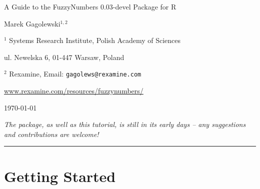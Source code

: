 \documentclass[11pt]{article}\usepackage{graphicx, color}
\newcommand{\hlnumber}[1]{\textcolor[rgb]{0,0,0}{#1}}%
\newcommand{\hlfunctioncall}[1]{\textcolor[rgb]{0.501960784313725,0,0.329411764705882}{\textbf{#1}}}%
\newcommand{\hlstring}[1]{\textcolor[rgb]{0.6,0.6,1}{#1}}%
\newcommand{\hlkeyword}[1]{\textcolor[rgb]{0,0,0}{\textbf{#1}}}%
\newcommand{\hlargument}[1]{\textcolor[rgb]{0.690196078431373,0.250980392156863,0.0196078431372549}{#1}}%
\newcommand{\hlcomment}[1]{\textcolor[rgb]{0.180392156862745,0.6,0.341176470588235}{#1}}%
\newcommand{\hlroxygencomment}[1]{\textcolor[rgb]{0.43921568627451,0.47843137254902,0.701960784313725}{#1}}%
\newcommand{\hlformalargs}[1]{\textcolor[rgb]{0.690196078431373,0.250980392156863,0.0196078431372549}{#1}}%
\newcommand{\hleqformalargs}[1]{\textcolor[rgb]{0.690196078431373,0.250980392156863,0.0196078431372549}{#1}}%
\newcommand{\hlassignement}[1]{\textcolor[rgb]{0,0,0}{\textbf{#1}}}%
\newcommand{\hlpackage}[1]{\textcolor[rgb]{0.588235294117647,0.709803921568627,0.145098039215686}{#1}}%
\newcommand{\hlslot}[1]{\textit{#1}}%
\newcommand{\hlsymbol}[1]{\textcolor[rgb]{0,0,0}{#1}}%
\newcommand{\hlprompt}[1]{\textcolor[rgb]{0.2,0.2,0.2}{#1}}%
\newcommand{\package}[1]{\textsf{#1}\xspace}
\newcommand{\lang}[1]{\textsf{#1}\xspace}
\newcommand{\R}{\lang{R}}
\begin{document}
\begin{center}
{\LARGE\sf A Guide to the \package{FuzzyNumbers} {0.03-devel} Package for \R}

\bigskip
{\large Marek Gagolewski${}^{1,2}$}

${}^{1}$ Systems Research Institute, Polish Academy of Sciences

ul. Newelska 6, 01-447 Warsaw, Poland

${}^{2}$ Rexamine, Email: \texttt{gagolews@rexamine.com}

\href{http://www.rexamine.com/resources/fuzzynumbers/}%
{www.rexamine.com/resources/fuzzynumbers/}

\bigskip
\today



\medskip
\textit{The package, as well as this tutorial, is still in its early
days -- any suggestions and contributions are welcome!}
\end{center}





\bigskip\hrule\bigskip
\tableofcontents









\section{Getting Started}
\end{document}

